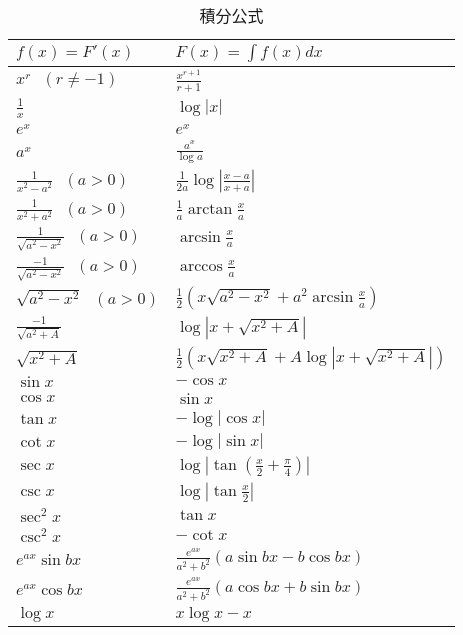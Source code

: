\documentclass[dvipdfmx,a4j,10pt]{jsarticle}
\theoremstyle{mystyle1}
\theoremstyle{mystyle2}
\begin{document}
\begin{table}[h]
\begin{center}
{\renewcommand\arraystretch{1.6}
 \small
\begin{tabular}{p{15em}|l} \hline
$f(x)=F'(x)$ & $F(x)=\int f(x) dx$ \\ \hline \hline
$x^r\ \ \ (r\neq -1)$ & $\displaystyle\frac{x^{r+1}}{r+1}$ \\
$\displaystyle \frac{1}{x}$ & $\log{|x|}$ \\
$e^x$ & $e^x$\\
$a^x$ & $\displaystyle \frac{a^x}{\log{a}}$\\
$\displaystyle \frac{1}{x^2-a^2}\ \ \ (a>0)$ & $\displaystyle \frac{1}{2a}\log\left|\frac{x-a}{x+a}\right|$\\
$\displaystyle \frac{1}{x^2+a^2}\ \ \ (a>0)$ & $\displaystyle \frac{1}{a}\arctan{\frac{x}{a}}$\\
$\displaystyle \frac{1}{\sqrt{a^2-x^2}}\ \ \ (a>0)$ & $\displaystyle \arcsin{\frac{x}{a}}$\\
$\displaystyle \frac{-1}{\sqrt{a^2-x^2}}\ \ \ (a>0)$ & $\displaystyle \arccos{\frac{x}{a}}$\\
$\sqrt{a^2-x^2}\ \ \ (a>0)$ & $\displaystyle\frac{1}{2}\left(x\sqrt{a^2-x^2}+a^2\arcsin{\frac{x}{a}}\right)$\\
$\displaystyle \frac{-1}{\sqrt{a^2+A}}$ & $\displaystyle\log\left|x+\sqrt{x^2+A}\right|$\\
$\sqrt{x^2+A}$ & $\displaystyle\frac{1}{2}\left(x\sqrt{x^2+A}+A\log\left|x+\sqrt{x^2+A}\right|\right)$\\
$\sin{x}$ & $-\cos{x}$\\
$\cos{x}$ & $\sin{x}$\\
$\tan{x}$ & $-\log|\cos x|$\\
$\cot{x}$ & $-\log|\sin x|$\\
$\sec{x}$ & $\displaystyle\log\left|\tan\left(\frac{x}{2}+\frac{\pi}{4}\right)\right|$\\
$\csc{x}$ & $\displaystyle\log\left|\tan\frac{x}{2}\right|$\\
$\sec^2 x$ & $\tan{x}$\\
$\csc^2 x$ & $-\cot{x}$\\
$e^{ax}\sin bx$ & $\displaystyle\frac{e^{ax}}{a^2+b^2}(a\sin bx-b\cos bx)$\\
$e^{ax}\cos bx$ & $\displaystyle\frac{e^{ax}}{a^2+b^2}(a\cos bx+b\sin bx)$\\
$\log x$ & $x\log x-x$\\ \hline
\end{tabular}
}
\caption{積分公式}
\end{center}
\end{table}
\end{document}
